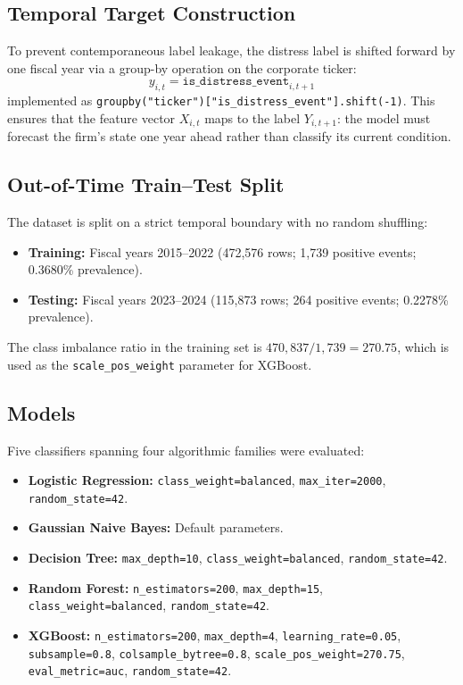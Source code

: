 \documentclass[sigconf,anonymous]{acmart}
\begin{document}
\subsection{Temporal Target Construction}
To prevent contemporaneous label leakage, the distress label is shifted forward by one fiscal year via a group-by operation on the corporate ticker:
\begin{equation}
    y_{i,t} = \texttt{is\_distress\_event}_{i,t+1}
\end{equation}
implemented as \texttt{groupby("ticker")["is\_distress\_event"].shift(-1)}. This ensures that the feature vector $X_{i,t}$ maps to the label $Y_{i,t+1}$: the model must forecast the firm's state one year ahead rather than classify its current condition.

\subsection{Out-of-Time Train--Test Split}
The dataset is split on a strict temporal boundary with no random shuffling:
\begin{itemize}
    \item \textbf{Training:} Fiscal years 2015--2022 (472,576 rows; 1,739 positive events; 0.3680\% prevalence).
    \item \textbf{Testing:} Fiscal years 2023--2024 (115,873 rows; 264 positive events; 0.2278\% prevalence).
\end{itemize}

The class imbalance ratio in the training set is $470{,}837 / 1{,}739 = 270.75$, which is used as the \texttt{scale\_pos\_weight} parameter for XGBoost.

\subsection{Models}
Five classifiers spanning four algorithmic families were evaluated:
\begin{itemize}
    \item \textbf{Logistic Regression:} \texttt{class\_weight=balanced}, \texttt{max\_iter=2000}, \texttt{random\_state=42}.
    \item \textbf{Gaussian Naive Bayes:} Default parameters.
    \item \textbf{Decision Tree:} \texttt{max\_depth=10}, \texttt{class\_weight=balanced}, \texttt{random\_state=42}.
    \item \textbf{Random Forest:} \texttt{n\_estimators=200}, \texttt{max\_depth=15}, \texttt{class\_weight=balanced}, \texttt{random\_state=42}.
    \item \textbf{XGBoost:} \texttt{n\_estimators=200}, \texttt{max\_depth=4}, \texttt{learning\_rate=0.05}, \texttt{subsample=0.8}, \texttt{colsample\_bytree=0.8}, \texttt{scale\_pos\_weight=270.75}, \texttt{eval\_metric=auc}, \texttt{random\_state=42}.
\end{itemize}
\end{document}
